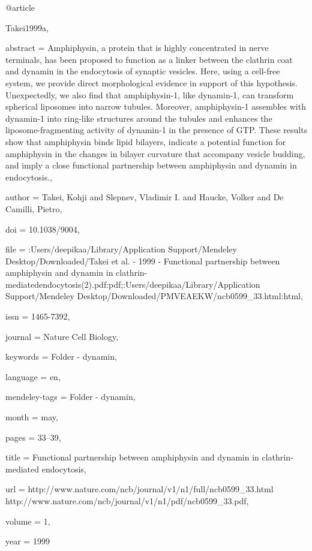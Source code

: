 @article{Takei1999a,

abstract = {Amphiphysin, a protein that is highly concentrated in nerve terminals, has been proposed to function as a linker between the clathrin coat and dynamin in the endocytosis of synaptic vesicles. Here, using a cell-free system, we provide direct morphological evidence in support of this hypothesis. Unexpectedly, we also find that amphiphysin-1, like dynamin-1, can transform spherical liposomes into narrow tubules. Moreover, amphiphysin-1 assembles with dynamin-1 into ring-like structures around the tubules and enhances the liposome-fragmenting activity of dynamin-1 in the presence of GTP. These results show that amphiphysin binds lipid bilayers, indicate a potential function for amphiphysin in the changes in bilayer curvature that accompany vesicle budding, and imply a close functional partnership between amphiphysin and dynamin in endocytosis.},

author = {Takei, Kohji and Slepnev, Vladimir I. and Haucke, Volker and {De Camilli}, Pietro},

doi = {10.1038/9004},

file = {:Users/deepikaa/Library/Application Support/Mendeley Desktop/Downloaded/Takei et al. - 1999 - Functional partnership between amphiphysin and dynamin in clathrin-mediatedendocytosis(2).pdf:pdf;:Users/deepikaa/Library/Application Support/Mendeley Desktop/Downloaded/PMVEAEKW/ncb0599{\_}33.html:html},

issn = {1465-7392},

journal = {Nature Cell Biology},

keywords = {Folder - dynamin},

language = {en},

mendeley-tags = {Folder - dynamin},

month = {may},

pages = {33--39},

title = {{Functional partnership between amphiphysin and dynamin in clathrin-mediated endocytosis}},

url = {http://www.nature.com/ncb/journal/v1/n1/full/ncb0599{\_}33.html http://www.nature.com/ncb/journal/v1/n1/pdf/ncb0599{\_}33.pdf},

volume = {1},

year = {1999}

}

